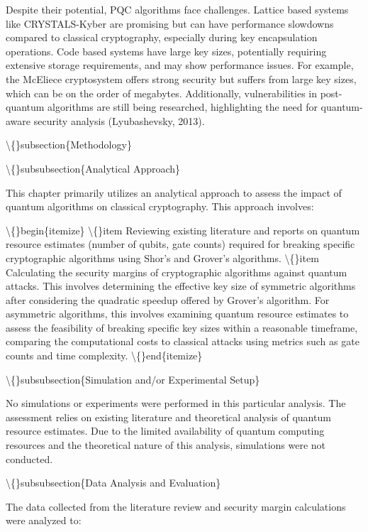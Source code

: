 \documentclass{article}
\begin{document}
Despite their potential, PQC algorithms face challenges. Lattice based systems like CRYSTALS-Kyber are promising but can have performance slowdowns compared to classical cryptography, especially during key encapsulation operations. Code based systems have large key sizes, potentially requiring extensive storage requirements, and may show performance issues. For example, the McEliece cryptosystem offers strong security but suffers from large key sizes, which can be on the order of megabytes. Additionally, vulnerabilities in post-quantum algorithms are still being researched, highlighting the need for quantum-aware security analysis (Lyubashevsky, 2013).

\textbackslash\{\}subsection\{Methodology\}

\textbackslash\{\}subsubsection\{Analytical Approach\}

This chapter primarily utilizes an analytical approach to assess the impact of quantum algorithms on classical cryptography. This approach involves:

\textbackslash\{\}begin\{itemize\}
    \textbackslash\{\}item Reviewing existing literature and reports on quantum resource estimates (number of qubits, gate counts) required for breaking specific cryptographic algorithms using Shor's and Grover's algorithms.
    \textbackslash\{\}item Calculating the security margins of cryptographic algorithms against quantum attacks. This involves determining the effective key size of symmetric algorithms after considering the quadratic speedup offered by Grover's algorithm. For asymmetric algorithms, this involves examining quantum resource estimates to assess the feasibility of breaking specific key sizes within a reasonable timeframe, comparing the computational costs to classical attacks using metrics such as gate counts and time complexity.
\textbackslash\{\}end\{itemize\}

\textbackslash\{\}subsubsection\{Simulation and/or Experimental Setup\}

No simulations or experiments were performed in this particular analysis. The assessment relies on existing literature and theoretical analysis of quantum resource estimates. Due to the limited availability of quantum computing resources and the theoretical nature of this analysis, simulations were not conducted.

\textbackslash\{\}subsubsection\{Data Analysis and Evaluation\}

The data collected from the literature review and security margin calculations were analyzed to:
\end{document}

